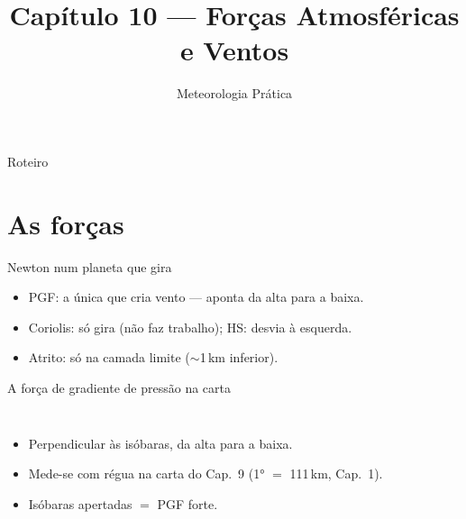 \documentclass[aspectratio=169,11pt]{beamer}
\title[Cap. 10 --- Forças e Ventos]{Capítulo 10 --- Forças Atmosféricas e
Ventos}
\subtitle{Meteorologia Prática}
\author{}
\date{}
\begin{document}
\begin{frame}
  \titlepage
  \vfill
  \atribuicao
\end{frame}

\begin{frame}{Roteiro}
  \tableofcontents
\end{frame}

\section{As forças}

\begin{frame}{Newton num planeta que gira}
  \vspace{0.5em}
  \begin{itemize}
    \item PGF: a única que \alert{cria} vento — aponta da alta para a
          baixa.
    \item Coriolis: só gira (não faz trabalho); HS: desvia à
          \alert{esquerda}.
    \item Atrito: só na camada limite ($\sim$1\,km inferior).
  \end{itemize}
\end{frame}

\begin{frame}{A força de gradiente de pressão na carta}
  \begin{columns}
    \vspace{0.4em}
    \begin{itemize}
      \item Perpendicular às isóbaras, da alta para a baixa.
      \item Mede-se com régua na carta do Cap.~9 (1° $=$ 111\,km,
            Cap.~1).
      \item Isóbaras apertadas $=$ PGF forte.
    \end{itemize}
  \end{columns}
\end{frame}
\end{document}
